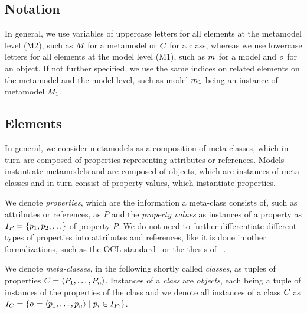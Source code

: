 

\subsection{Notation}

In general, we use variables of uppercase letters for all elements at the metamodel level (M2), such as $M_{}$ for a metamodel or $C_{}$ for a class, whereas we use lowercase letters for all elements at the model level (M1), such as $m_{}$ for a model and $o_{}$ for an object.
If not further specified, we use the same indices on related elements on the metamodel and the model level, such as model $m_{1}$ being an instance of metamodel $M_{1}$.

\subsection{Elements}

In general, we consider metamodels as a composition of meta-classes, which in turn are composed of properties representing attributes or references.
Models instantiate metamodels and are composed of objects, which are instances of meta-classes and in turn consist of property values, which instantiate properties.

We denote \emph{properties}, which are the information a meta-class consists of, such as attributes or references, as $P$ and the \emph{property values} as instances of a property as $\instances{P} = \setted{p_1, p_2, \dots}$ of property $P$. 
We do not need to further differentiate different types of properties into attributes and references, like it is done in other formalizations, such as the OCL standard~\cite[A.1]{ocl} or the thesis of \citeauthor{kramer2017a}~\cite[2.3.2]{kramer2017a}.

We denote \emph{meta-classes}, in the following shortly called \emph{classes}, as tuples of properties $C_{} = \langle P_1, \dots, P_n \rangle$. 
Instances of a \emph{class} are \emph{objects}, each being a tuple of instances of the properties of the class and we denote all instances of a class $C_{}$ as $I_{C_{}} = \{ o_{} = \langle p_1, \dots, p_n \rangle \mid p_i \in I_{P_i} \}$.

